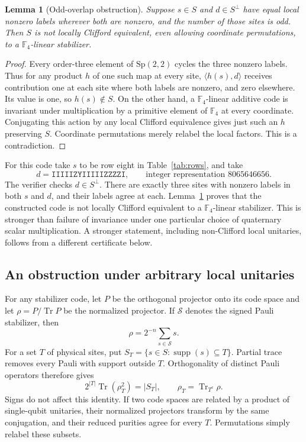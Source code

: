 \documentclass[11pt]{article}
\newtheorem{lemma}[theorem]{Lemma}
\newcommand{\F}{\mathbb F}
\begin{document}
\begin{lemma}[Odd-overlap obstruction]\label{lem:overlap}
Suppose $s\in S$ and $d\in S^\perp$ have equal local nonzero labels wherever both are nonzero, and the number of those sites is odd. Then $S$ is not locally Clifford equivalent, even allowing coordinate permutations, to a $\F_4$-linear stabilizer.
\end{lemma}
\begin{proof}
Every order-three element of $\mathrm{Sp}(2,2)$ cycles the three nonzero labels. Thus for any product $h$ of one such map at every site, $\langle h(s),d\rangle$ receives contribution one at each site where both labels are nonzero, and zero elsewhere. Its value is one, so $h(s)\notin S$. On the other hand, a $\F_4$-linear additive code is invariant under multiplication by a primitive element of $\F_4$ at every coordinate. Conjugating this action by any local Clifford equivalence gives just such an $h$ preserving $S$. Coordinate permutations merely relabel the local factors. This is a contradiction.
\end{proof}
For this code take $s$ to be row eight in Table~\ref{tab:rows}, and take
\[
 d=\texttt{IIIIIZYIIIIIZZZZI},
 \qquad\text{integer representation }8065646656.
\]
The verifier checks $d\in S^\perp$. There are exactly three sites with nonzero labels in both $s$ and $d$, and their labels agree at each. Lemma~\ref{lem:overlap} proves that the constructed code is not locally Clifford equivalent to a $\F_4$-linear stabilizer. This is stronger than failure of invariance under one particular choice of quaternary scalar multiplication. A stronger statement, including non-Clifford local unitaries, follows from a different certificate below.


\subsection{An obstruction under arbitrary local unitaries}
For any stabilizer code, let $P$ be the orthogonal projector onto its code space and let $\rho=P/\operatorname{Tr}P$ be the normalized projector. If $\mathcal S$ denotes the signed Pauli stabilizer, then
\[
 \rho=2^{-n}\sum_{s\in\mathcal S}s.
\]
For a set $T$ of physical sites, put $S_T=\{s\in S:\operatorname{supp}(s)\subseteq T\}$. Partial trace removes every Pauli with support outside $T$. Orthogonality of distinct Pauli operators therefore gives
\begin{equation}\label{eq:purity}
 2^{|T|}\operatorname{Tr}(\rho_T^2)=|S_T|,
 \qquad \rho_T=\operatorname{Tr}_{T^c}\rho.
\end{equation}
Signs do not affect this identity. If two code spaces are related by a product of single-qubit unitaries, their normalized projectors transform by the same conjugation, and their reduced purities agree for every $T$. Permutations simply relabel these subsets.
\end{document}
